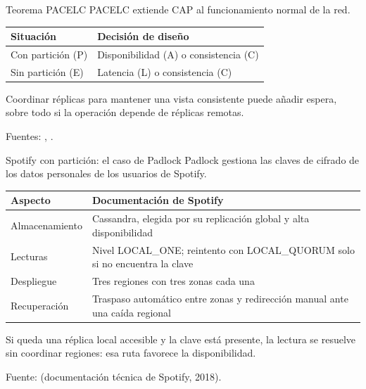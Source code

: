 \begin{frame}{Teorema PACELC}
  PACELC extiende CAP al funcionamiento normal de la red.

  \bigskip
  \centering
  \small
  \renewcommand{\arraystretch}{1.4}
  \begin{tabular}{p{} p{}}
    \toprule
    \textbf{Situación} & \textbf{Decisión de diseño} \\
    \midrule
    Con partición (P) & Disponibilidad (A) o consistencia (C) \\
    Sin partición (E) & Latencia (L) o consistencia (C) \\
    \bottomrule
  \end{tabular}

  \bigskip
  \raggedright
  Coordinar réplicas para mantener una vista consistente puede añadir
  espera, sobre todo si la operación depende de réplicas remotas.

  \vfill
  \footnotesize Fuentes: \cite[p.~172]{ahmed2023consistency},
  \cite[p.~51:4]{almeida2024crdt}.
\end{frame}

\begin{frame}{Spotify con partición: el caso de Padlock}
  Padlock gestiona las claves de cifrado de los datos personales de los
  usuarios de Spotify.

  \bigskip
  \small
  \renewcommand{\arraystretch}{1.35}
  \begin{tabular}{p{} p{}}
    \toprule
    \textbf{Aspecto} & \textbf{Documentación de Spotify} \\
    \midrule
    Almacenamiento & Cassandra, elegida por su replicación global y alta
      disponibilidad \\
    Lecturas & Nivel LOCAL\_ONE; reintento con LOCAL\_QUORUM solo si no
      encuentra la clave \\
    Despliegue & Tres regiones con tres zonas cada una \\
    Recuperación & Traspaso automático entre zonas y redirección manual
      ante una caída regional \\
    \bottomrule
  \end{tabular}

  \bigskip
  \raggedright
  Si queda una réplica local accesible y la clave está presente, la
  lectura se resuelve sin coordinar regiones: esa ruta favorece la
  disponibilidad.

  \vfill
  \footnotesize Fuente: \cite{leenders2018padlock} (documentación técnica
  de Spotify, 2018).
\end{frame}

